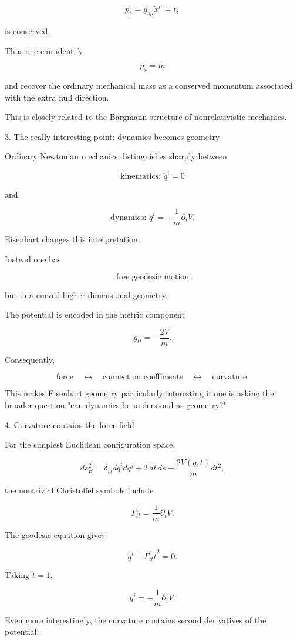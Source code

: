 $$ p_s=g_{s\mu}\dot x^\mu=\dot t, $$

is conserved.

Thus one can identify

$$ p_s=m $$

and recover the ordinary mechanical mass as a conserved momentum associated with the extra null direction.

This is closely related to the Bargmann structure of nonrelativistic mechanics.

3. The really interesting point: dynamics becomes geometry

Ordinary Newtonian mechanics distinguishes sharply between

$$ \text{kinematics: } \ddot q^i=0 $$

and

$$ \text{dynamics: } \ddot q^i=-\frac1m\partial_iV. $$

Eisenhart changes this interpretation.

Instead one has

$$ \boxed{ \text{free geodesic motion} } $$

but in a curved higher-dimensional geometry.

The potential is encoded in the metric component

$$ g_{tt}=-\frac{2V}{m}. $$

Consequently,

$$ \text{force} \quad\longleftrightarrow\quad \text{connection coefficients} \quad\longleftrightarrow\quad \text{curvature}. $$

This makes Eisenhart geometry particularly interesting if one is asking the broader question "can dynamics be understood as geometry?"

4. Curvature contains the force field

For the simplest Euclidean configuration space,

$$ ds_E^2 = \delta_{ij}dq^i dq^j +2\,dt\,ds -\frac{2V(q,t)}{m}dt^2, $$

the nontrivial Christoffel symbols include

$$ \Gamma^i_{tt} = \frac{1}{m}\partial_iV. $$

The geodesic equation gives

$$ \ddot q^i+\Gamma^i_{tt}\dot t^2=0. $$

Taking \(\dot t=1\),

$$ \ddot q^i = -\frac1m\partial_iV. $$

Even more interestingly, the curvature contains second derivatives of the potential:

